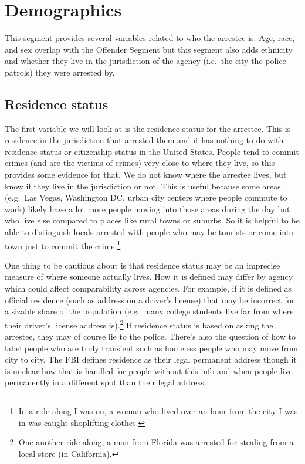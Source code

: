 \documentclass[
]{krantz}
\begin{document}
\section{Demographics}\label{demographics-3}

This segment provides several variables related to who the
arrestee is. Age, race, and sex overlap with the Offender
Segment but this segment also adds ethnicity and whether
they live in the jurisdiction of the agency (i.e.~the city
the police patrols) they were arrested by.

\subsection{Residence status}\label{residence-status-1}

The first variable we will look at is the residence status
for the arrestee. This is residence in the jurisdiction that
arrested them and it has nothing to do with residence status
or citizenship status in the United States. People tend to
commit crimes (and are the victims of crimes) very close to
where they live, so this provides some evidence for that. We
do not know where the arrestee lives, but know if they live
in the jurisdiction or not. This is useful because some
areas (e.g.~Las Vegas, Washington DC, urban city centers
where people commute to work) likely have a lot more people
moving into those areas during the day but who live else
compared to places like rural towns or suburbs. So it is
helpful to be able to distinguish locals arrested with
people who may be tourists or come into town just to commit
the crime.\footnote{In a ride-along I was on, a woman who
  lived over an hour from the city I was in was caught
  shoplifting clothes.}

One thing to be cautious about is that residence status may
be an imprecise measure of where someone actually lives. How
it is defined may differ by agency which could affect
comparability across agencies. For example, if it is defined
as official residence (such as address on a driver's
license) that may be incorrect for a sizable share of the
population (e.g.~many college students live far from where
their driver's license address is).\footnote{One another
  ride-along, a man from Florida was arrested for stealing
  from a local store (in California).} If residence status
is based on asking the arrestee, they may of course lie to
the police. There's also the question of how to label people
who are truly transient such as homeless people who may move
from city to city. The FBI defines residence as their legal
permanent address though it is unclear how that is handled
for people without this info and when people live
permanently in a different spot than their legal address.
\end{document}

